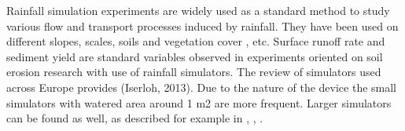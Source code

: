 Rainfall simulation experiments are widely used as a standard method to study various flow and transport processes induced by rainfall. They have been used on different slopes, scales, soils and vegetation cover  \cite{Otero2011, Davidova2016}, etc. Surface runoff rate and sediment yield are standard variables observed in experiments oriented on soil erosion research with use of rainfall simulators. The review of simulators used across Europe provides (Iserloh, 2013). Due to the nature of the device the small simulators with watered area around 1 m2 are more frequent. Larger simulators can be found as well, as described for example in \cite{Sanguesa2010}, \cite{Strauss2000} \cite{Marques2007},  \citep{EGUDS}.